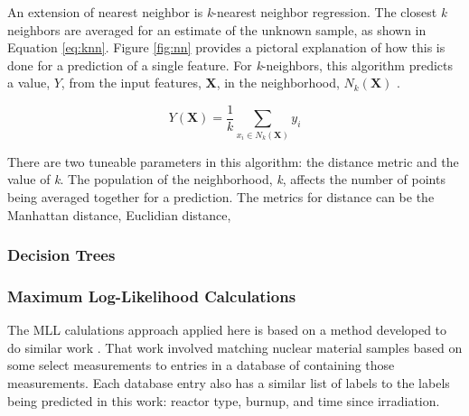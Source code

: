 An extension of nearest neighbor is \textit{k}-nearest neighbor regression.
The closest \textit{k} neighbors are averaged for an estimate of the unknown
sample, as shown in Equation \ref{eq:knn}.  Figure \ref{fig:nn} provides a
pictoral explanation of how this is done for a prediction of a single feature.
For \textit{k}-neighbors, this algorithm predicts a value, $Y$, from the input
features, $\boldsymbol{X}$, in the neighborhood, $N_k (\boldsymbol{X})$
\cite{elements_stats}. 

\begin{equation}
  Y(\boldsymbol{X}) = \frac{1}{k} \sum_{x_i \in N_k(\boldsymbol{X})} y_i
  \label{eq:knn}
\end{equation}

There are two tuneable parameters in this algorithm: the distance metric and
the value of \textit{k}.  The population of the neighborhood, \textit{k},
affects the number of points being averaged together for a prediction.  The
metrics for distance can be the Manhattan distance, Euclidian distance, 

\subsubsection{Decision Trees}



\subsubsection{Maximum Log-Likelihood Calculations}

The \gls{MLL} calulations approach applied here is based on a method developed
to do similar work \cite{mll_method, mll_validate, mll_sensitivity}.  That work
involved matching nuclear material samples based on some select measurements to
entries in a database of containing those measurements.
Each database entry also has a similar list of labels to the labels being
predicted in this work: reactor type, burnup, and time since irradiation.

